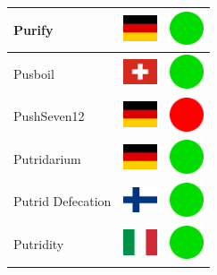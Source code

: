 \documentclass[12pt, a4paper, twoside]{report}
\begin{document}
\begin{center}
\begin{longtable}{|p{5cm}|p{2cm}|p{2cm}|}
 Purify                                                     & \includegraphics[width=1cm]{../4x3/de} &   \includegraphics[width=1cm]{../likes/y} \\ \hline
 Pusboil                                                    & \includegraphics[width=1cm]{../4x3/ch} &   \includegraphics[width=1cm]{../likes/y} \\ \hline
 PushSeven12                                                & \includegraphics[width=1cm]{../4x3/de} &   \includegraphics[width=1cm]{../likes/n} \\ \hline
 Putridarium                                                & \includegraphics[width=1cm]{../4x3/de} &   \includegraphics[width=1cm]{../likes/y} \\ \hline
 Putrid Defecation                                          & \includegraphics[width=1cm]{../4x3/fi} &   \includegraphics[width=1cm]{../likes/y} \\ \hline
 Putridity                                                  & \includegraphics[width=1cm]{../4x3/it} &   \includegraphics[width=1cm]{../likes/y} \\ \hline

\end{longtable}
\end{center}
\end{document}
